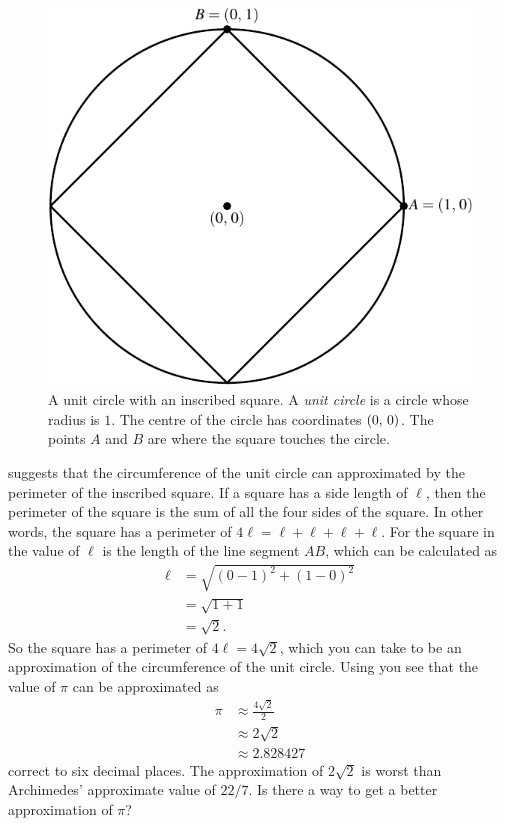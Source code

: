 \documentclass[a4paper,oneside,12pt]{article}
\begin{document}
\begin{figure}[!htbp]
\centering
\includegraphics[scale=1]{image/05/circle-square.pdf}
\caption{%
  A unit circle with an inscribed square.  A \emph{unit circle} is a
  circle whose radius is $1$.  The centre of the circle has
  coordinates $\left\lparen{0},\, {0}\right\rparen$.  The points $A$ and $B$ are where the
  square touches the circle.
}
\label{fig:circle_inscribed_square}
\end{figure}

 suggests that the circumference
of the unit circle can approximated by the perimeter of the inscribed
square.  If a square has a side length of $\ell$, then the perimeter
of the square is the sum of all the four sides of the square.  In
other words, the square has a perimeter of
$4\ell = \ell + \ell + \ell + \ell$.  For the square in
 the value of $\ell$ is the length
of the line segment $AB$, which can be calculated as
\begin{align*}
\ell
&=
\sqrt{(0 - 1)^2 + (1 - 0)^2} \\[4pt]
&=
\sqrt{1 + 1} \\[4pt]
&=
\sqrt{2}.
\end{align*}
So the square has a perimeter of $4\ell = 4\sqrt{2}$, which you can
take to be an approximation of the circumference of the unit circle.
Using  you see that the
value of $\pi$ can be approximated as
\begin{align*}
\pi
&\approx
\frac{4\sqrt{2}}{2} \\[4pt]
&\approx
2\sqrt{2} \\[4pt]
&\approx
2.828427
\end{align*}
correct to six decimal places.  The approximation of $2\sqrt{2}$ is
worst than Archimedes' approximate value of $22/7$.  Is there a way to
get a better approximation of $\pi$?
\end{document}
